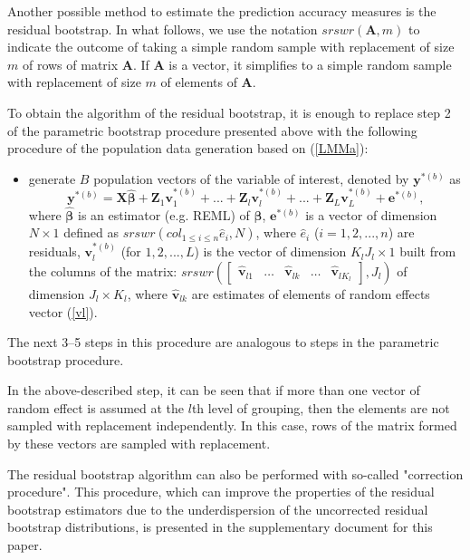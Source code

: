Another possible method to estimate the prediction accuracy measures is the residual bootstrap. In what follows, we use the notation $srswr(\mathbf{A}, m)$ to indicate the outcome of taking a simple random sample with replacement of size $m$ of rows of matrix $\mathbf{A}$. If $\mathbf{A}$ is a vector, it simplifies to a simple random sample with replacement of size $m$ of elements of $\mathbf{A}$.

To obtain the algorithm of the residual bootstrap, it is enough to replace step 2 of the parametric bootstrap procedure presented above with the following procedure of the population data generation based on (\ref{LMMa}):
\begin{itemize}
	\item generate $B$ population vectors of the variable of interest, denoted by $\mathbf{y}^{*(b)}$ as
	\begin{equation}\label{LMMboot}
		\mathbf{y}^{*(b)}=\mathbf{X}\hat{\boldsymbol{\beta}} + \mathbf{Z}_1\mathbf{v}^{*(b)}_1+...+\mathbf{Z}_l\mathbf{v}^{*(b)}_l+...+\mathbf{Z}_L\mathbf{v}^{*(b)}_L+\mathbf{e}^{*(b)},
	\end{equation}
	where $\hat{\boldsymbol{\beta}}$ is an estimator (e.g. REML) of ${\boldsymbol{\beta}}$,
	$\mathbf{e}^{*(b)}$ is a vector of dimension $N \times 1$ defined as $srswr(col_{1 \leq i \leq n } \hat{{e}}_{i}, N)$, where $\hat{{e}}_{i}$ ($i=1,2,...,n$) are residuals, $\mathbf{v}^{*(b)}_l$ (for $1,2,...,L$) is the vector of dimension $K_l J_l \times 1$ built from the columns of the matrix:
	$srswr \left(
	\left[ \begin{array}{ccccc}
		\hat{\mathbf{v}}_{l1} &
		\dots &
		\hat{\mathbf{v}}_{lk} &
		\dots &
		\hat{\mathbf{v}}_{lK_l}
	\end{array}
	\right], J_l
	\right)$
of dimension $J_l \times K_l$, where $\hat{\mathbf{v}}_{lk}$ are estimates of elements of random effects vector (\ref{vl}).
	
\end{itemize}
The next 3–5 steps in this procedure are analogous to steps in the parametric bootstrap procedure.

In the above-described step, it can be seen that if more than one vector of random effect is assumed at the $l$th level of grouping, then the elements are not sampled with replacement independently. In this case, rows of the matrix formed by these vectors are sampled with replacement.

The residual bootstrap algorithm can also be performed with so-called "correction procedure". This procedure, which can improve the properties of the residual bootstrap estimators due to the underdispersion of the uncorrected residual bootstrap distributions, is presented in the supplementary document for this paper.

